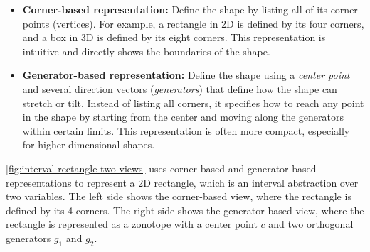 \documentclass[oneside,11pt,dvipsnames]{book}
\numberwithin{equation}{section}
\theoremstyle{definition}
\theoremstyle{remark}
\begin{document}
\begin{itemize}
  \item \textbf{Corner-based representation:} Define the shape by listing all of its corner points (vertices). For example, a rectangle in 2D is defined by its four corners, and a box in 3D is defined by its eight corners. This representation is intuitive and directly shows the boundaries of the shape.

  \item \textbf{Generator-based representation:} Define the shape using a \emph{center point} and several direction vectors (\emph{generators}) that define how the shape can stretch or tilt. Instead of listing all corners, it specifies how to reach any point in the shape by starting from the center and moving along the generators within certain limits.  This representation is often more compact, especially for higher-dimensional shapes.
\end{itemize}

\autoref{fig:interval-rectangle-two-views} uses corner-based and generator-based representations to represent a 2D rectangle, which is an interval abstraction over two variables.  The left side shows the corner-based view, where the rectangle is defined by its 4 corners.  The right side shows the generator-based view, where the rectangle is represented as a zonotope with a center point \(c\) and two orthogonal generators \(g_1\) and \(g_2\).
\end{document}
